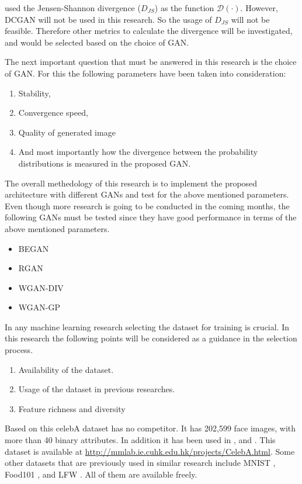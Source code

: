 \documentclass[../main/main.tex]{subfiles}
\begin{document}
	 used the Jensen-Shannon divergence ($D_{JS}$) as the function $\mathcal{D}(\cdot)$. However, \gls{DCGAN} will not be used in this research. So the usage of $D_{JS}$ will not be feasible. Therefore other metrics to calculate the divergence will be investigated, and would be selected based on the choice of \gls{GAN}.  
	
	The next important question that must be answered in this research is the choice of \gls{GAN}. For this the following parameters have been taken into consideration:
	\begin{enumerate}
		\item Stability,
		\item Convergence speed,
		\item Quality of  generated image 
		\item And most importantly how the divergence between the probability distributions is measured in the proposed \gls{GAN}.
	\end{enumerate}

	The overall methedology of this research is to implement the proposed architecture with different \gls{GAN}s and test for the above mentioned parameters. Even though more research is going to be conducted in the coming months, the following \gls{GAN}s must be tested since they have good performance in terms of the above mentioned parameters. 
	
	\begin{itemize}
		\item \gls{BEGAN}  
		\item \gls{RGAN} 
		\item  \gls{WGAN-DIV} 
		\item \gls{WGAN-GP} 
	\end{itemize}

	In any machine learning research selecting the dataset for training is crucial. In this research the following points will be considered as a guidance in the selection process. 
	
	\begin{enumerate}
		\item Availability of the dataset.
		\item Usage of the dataset in previous researches.
		\item Feature richness and diversity
	\end{enumerate}
	Based on this celebA  dataset has no competitor.  It has 202,599 face images, with more than 40 binary attributes. In addition it has been used in ,  and . This dataset is available at \url{http://mmlab.ie.cuhk.edu.hk/projects/CelebA.html}. Some other datasets that are previously used in similar research include MNIST , Food101 , and LFW . All of them are available freely. 
	
\end{document}
